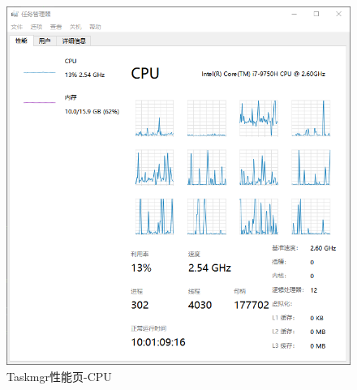 \documentclass[UTF8,twoside,titlepage]{ctexart}
\begin{document}
\begin{landscape}
\begin{multicols}{2}
\begin{figure}[H]
    \centering
    \includegraphics[scale=0.6]{../media/comparison/mgr perftab cpu.png}
    \caption{Taskmgr性能页-CPU}
    \label{fig:mgrcpu}
\end{figure}

\end{multicols}

\vfill
\hspace{0pt}
\end{landscape}
\end{document}
